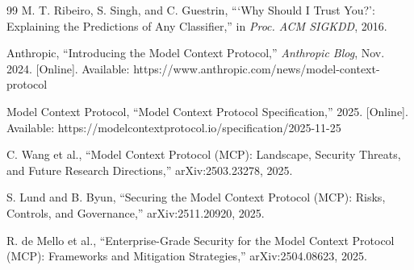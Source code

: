 \documentclass[11pt,conference]{IEEEtran}
\begin{document}
\begin{thebibliography}{99}
M. T. Ribeiro, S. Singh, and C. Guestrin, ```Why Should I Trust You?': Explaining the Predictions of Any Classifier,'' in \textit{Proc. ACM SIGKDD}, 2016.

Anthropic, ``Introducing the Model Context Protocol,'' \textit{Anthropic Blog}, Nov. 2024. [Online]. Available: https://www.anthropic.com/news/model-context-protocol

Model Context Protocol, ``Model Context Protocol Specification,'' 2025. [Online]. Available: https://modelcontextprotocol.io/specification/2025-11-25

C. Wang et al., ``Model Context Protocol (MCP): Landscape, Security Threats, and Future Research Directions,'' arXiv:2503.23278, 2025.

S. Lund and B. Byun, ``Securing the Model Context Protocol (MCP): Risks, Controls, and Governance,'' arXiv:2511.20920, 2025.

R. de Mello et al., ``Enterprise-Grade Security for the Model Context Protocol (MCP): Frameworks and Mitigation Strategies,'' arXiv:2504.08623, 2025.

\end{thebibliography}

\balance
\end{document}
